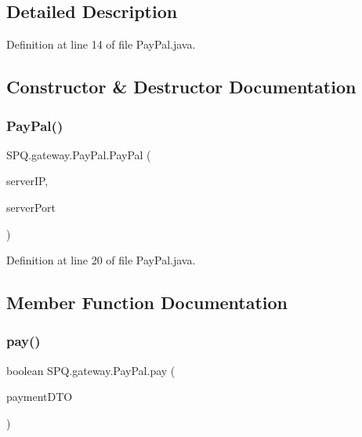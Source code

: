 \subsection{Detailed Description}


Definition at line 14 of file Pay\+Pal.\+java.



\subsection{Constructor \& Destructor Documentation}
\mbox{\label{class_s_p_q_1_1gateway_1_1_pay_pal_ab34e6213b4dbfeccc87da6bcd486bbf3}} 
\subsubsection{\texorpdfstring{Pay\+Pal()}{PayPal()}}
{\footnotesize\ttfamily S\+P\+Q.\+gateway.\+Pay\+Pal.\+Pay\+Pal (\begin{DoxyParamCaption}\item[{String}]{server\+IP,  }\item[{String}]{server\+Port }\end{DoxyParamCaption})}



Definition at line 20 of file Pay\+Pal.\+java.



\subsection{Member Function Documentation}
\mbox{\label{class_s_p_q_1_1gateway_1_1_pay_pal_a4f12e3d9fd7cc1ebf54e885df464f1d4}} 
\subsubsection{\texorpdfstring{pay()}{pay()}}
{\footnotesize\ttfamily boolean S\+P\+Q.\+gateway.\+Pay\+Pal.\+pay (\begin{DoxyParamCaption}\item[{\mbox{\hyperlink{class_s_p_q_1_1dto_1_1_payment_d_t_o}{Payment\+D\+TO}}}]{payment\+D\+TO }\end{DoxyParamCaption})}



